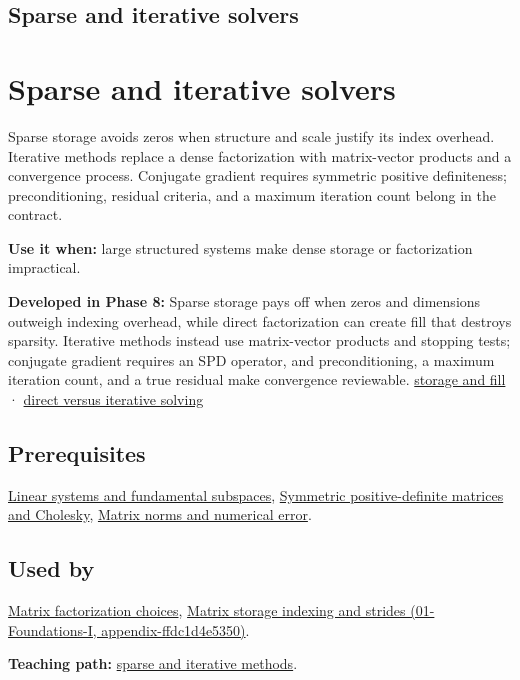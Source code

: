 \hypertarget{appendix-67c87a3d9e94}{}
\section*{Sparse and iterative solvers}
\chapter{Sparse and iterative solvers}\label{appendix-67c87a3d9e94-sparse-and-iterative-solvers}

Sparse storage avoids zeros when structure and scale justify its index overhead. Iterative methods replace a dense factorization with matrix-vector products and a convergence process. Conjugate gradient requires symmetric positive definiteness; preconditioning, residual criteria, and a maximum iteration count belong in the contract.

\textbf{Use it when:} large structured systems make dense storage or factorization impractical.

\textbf{Developed in Phase 8:} Sparse storage pays off when zeros and dimensions outweigh indexing overhead, while direct factorization can create fill that destroys sparsity. Iterative methods instead use matrix-vector products and stopping tests; conjugate gradient requires an SPD operator, and preconditioning, a maximum iteration count, and a true residual make convergence reviewable. \href{Continuous\%20Notes/Computing\%20Foundations\%20-\%20From\%20Bits\%20to\%20C++\%20and\%20Systems\%20APIs\#Sparse\%20storage\%20changes\%20the\%20cost\%20model}{storage and fill} · \href{Continuous\%20Notes/Computing\%20Foundations\%20-\%20From\%20Bits\%20to\%20C++\%20and\%20Systems\%20APIs\#Direct\%20and\%20iterative\%20solvers\%20suit\%20different\%20workloads}{direct versus iterative solving}

\section{Prerequisites}\label{appendix-67c87a3d9e94-prerequisites}

\hyperref[appendix-8572a4a060c1]{Linear systems and fundamental subspaces}, \hyperref[appendix-50d2ea3c9b26]{Symmetric positive-definite matrices and Cholesky}, \hyperref[appendix-f8657bac66e5]{Matrix norms and numerical error}.

\section{Used by}\label{appendix-67c87a3d9e94-used-by}

\hyperref[appendix-221a483bec2d]{Matrix factorization choices}, \href{../01-Foundations-I/main.pdf\#nameddest=appendix-ffdc1d4e5350}{Matrix storage indexing and strides (01-Foundations-I, appendix-ffdc1d4e5350)}.

\textbf{Teaching path:} \href{Continuous\%20Notes/Computing\%20Foundations\%20-\%20From\%20Bits\%20to\%20C++\%20and\%20Systems\%20APIs\#Sparse\%20problems\%20change\%20the\%20economics\%20of\%20solving}{sparse and iterative methods}.
